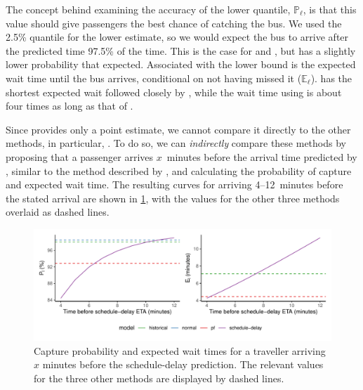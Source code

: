 The concept behind examining the accuracy of the lower quantile, $\mathbb{P}_\ell$, is that this value should give passengers the best chance of catching the bus. We used the 2.5\% quantile for the lower estimate, so we would expect the bus to arrive after the predicted time 97.5\% of the time. This is the case for \Fnorm{} and \Fhist{}, but \Fpf{} has a slightly lower probability that expected. Associated with the lower bound is the expected wait time until the bus arrives, conditional on not having missed it ($\mathbb{E}_\ell$). \Fpf{} has the shortest expected wait followed closely by \Fhist{}, while the wait time using \Fnorm{} is about four times as long as that of \Fpf{}.


Since \Fsched{} provides only a point estimate, we cannot compare it directly to the other methods, in particular, \Fpf{}. To do so, we can \emph{indirectly} compare these methods by proposing that a passenger arrives $x$~minutes before the arrival time predicted by \Fsched{}, similar to the method described by \citet{Cathey_2003}, and calculating the probability of capture and expected wait time. The resulting curves for arriving 4--12~minutes before the stated arrival are shown in \cref{fig:model_results_pr_gtfs}, with the values for the other three methods overlaid as dashed lines.


\begin{knitrout}\small
{}\color{fgcolor}\begin{figure}

{\centering \includegraphics[width=\textwidth]{figure/model_results_pr_gtfs-1} 

}

\caption[Capture probability and expected wait times for schedule-delay predictions]{Capture probability and expected wait times for a traveller arriving $x$ minutes before the schedule-delay prediction. The relevant values for the three other methods are displayed by dashed lines.}\label{fig:model_results_pr_gtfs}
\end{figure}


\end{knitrout}



